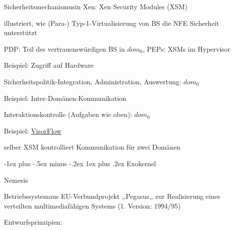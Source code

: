 \documentclass[a4paper]{article}
\makeatletter
\renewcommand{\subsubsection}{\@startsection{subsubsection}{3}{0mm}%
 {-1ex plus -.5ex minus -.2ex}%
 {1ex plus .2ex}%
 {\normalfont\small\bfseries}}
\makeatother
\begin{document}
\begin{multicols}{3}
    \begin{itemize*}
        \item
        Sicherheitsmechanismusin Xen: Xen Security Modules (XSM)
        \item
        illustriert, wie (Para-) Typ-1-Virtualisierung von BS die NFE
        Sicherheit unterstützt
        \item
        PDP: Teil des vertrauenswürdigen BS in $dom_0$, PEPs: XSMs im
        Hypervisor
        \item
        Beispiel: Zugriff auf Hardware
        \begin{itemize*}
            \item Sicherheitspolitik-Integration, Administration, Auswertung: $dom_0$
        \end{itemize*}
        \item
        Beispiel: Inter-Domänen-Kommunikation
        \begin{itemize*}
            \item Interaktionskontrolle (Aufgaben wie oben): $dom_0$
            \item Beispiel: \href{https://www.flyn.org/projects/VisorFlow/}{VisorFlow}
            \item selber XSM kontrolliert Kommunikation für zwei Domänen
        \end{itemize*}
    \end{itemize*}


    \subsubsection{Exokernel}

    Nemesis

    \begin{itemize*}
        \item
        Betriebssystemaus EU-Verbundprojekt ,,Pegasus,, zur Realisierung eines
        verteilten multimediafähigen Systems (1. Version: 1994/95)
        \item
        Entwurfsprinzipien:
        \begin{enumerate*}


\end{enumerate*}
\end{itemize*}
\end{multicols}
\end{document}

